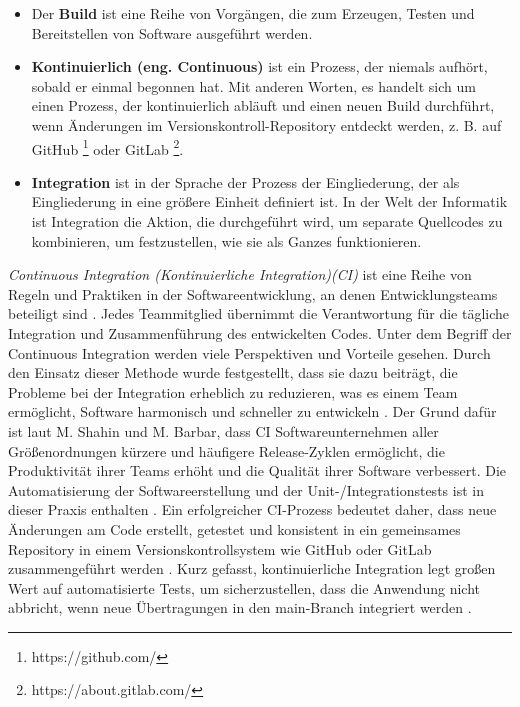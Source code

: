 \begin{itemize}
	\item Der \textbf{Build}  ist eine Reihe von Vorgängen, die zum Erzeugen, Testen und Bereitstellen von Software ausgeführt werden.
	
	\item \textbf{Kontinuierlich (eng. Continuous)} ist ein Prozess, der niemals aufhört, sobald er einmal begonnen hat. Mit anderen Worten, es handelt sich um einen Prozess, der kontinuierlich abläuft und einen neuen Build durchführt, wenn Änderungen im Versionskontroll-Repository entdeckt werden, z. B. auf GitHub \footnote{https://github.com/} oder GitLab \footnote{https://about.gitlab.com/}.
	
	\item \textbf{Integration} ist in der Sprache der Prozess der Eingliederung, der als Eingliederung in eine größere Einheit definiert ist. In der Welt der Informatik ist Integration die Aktion, die durchgeführt wird, um separate Quellcodes zu kombinieren, um festzustellen, wie sie als Ganzes funktionieren.
	
\end{itemize}
%
\textit{Continuous Integration (Kontinuierliche Integration)(CI)} ist eine Reihe von Regeln und Praktiken in der Softwareentwicklung, an denen Entwicklungsteams beteiligt sind \cite{Meyer2014}. Jedes Teammitglied übernimmt die Verantwortung für die tägliche Integration und Zusammenführung des entwickelten Codes. Unter dem Begriff der Continuous Integration werden viele Perspektiven und Vorteile gesehen. Durch den Einsatz dieser Methode wurde festgestellt, dass sie dazu beiträgt, die Probleme bei der Integration erheblich zu reduzieren, was es einem Team ermöglicht, Software harmonisch und schneller zu entwickeln \cite{Fowler2006}. Der Grund dafür ist laut M. Shahin und M. Barbar, dass CI Softwareunternehmen aller Größenordnungen kürzere und häufigere Release-Zyklen ermöglicht, die Produktivität ihrer Teams erhöht und die Qualität ihrer Software verbessert. Die Automatisierung der Softwareerstellung und der Unit-/Integrationstests ist in dieser Praxis enthalten \cite{Shahin2017}. Ein erfolgreicher CI-Prozess bedeutet daher, dass neue Änderungen am Code erstellt, getestet und konsistent in ein gemeinsames Repository in einem Versionskontrollsystem wie GitHub oder GitLab zusammengeführt werden \cite{RedHat2018}. Kurz gefasst, kontinuierliche Integration legt großen Wert auf automatisierte Tests, um sicherzustellen, dass die Anwendung nicht abbricht, wenn neue Übertragungen in den main-Branch integriert werden \cite{Atlassian}.

